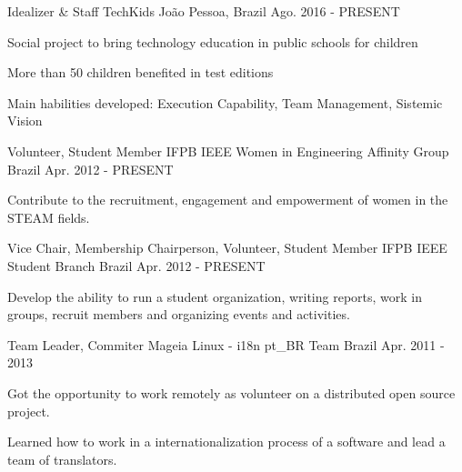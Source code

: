 \begin{cventries}
\cventry
    {Idealizer \& Staff}
    {TechKids}
    {João Pessoa, Brazil}
    {Ago. 2016 - PRESENT}
    {
      \begin{cvitems}
        \item {Social project to bring technology education in public schools for children}
        \item {More than 50 children benefited in test editions}
        \item {Main habilities developed: Execution Capability, Team Management, Sistemic Vision}
      \end{cvitems}
    }
    
  \cventry
    {Volunteer, Student Member} %
    {IFPB IEEE Women in Engineering Affinity Group} %
    {Brazil} %
    {Apr. 2012 - PRESENT} %
    {
      \begin{cvitems} %
       \item {Contribute to the recruitment, engagement and empowerment of women in the STEAM fields.}
      \end{cvitems}
    }

  \cventry
    {Vice Chair, Membership Chairperson, Volunteer, Student Member} %
    {IFPB IEEE Student Branch} %
    {Brazil} %
    {Apr. 2012 - PRESENT} %
    {
      \begin{cvitems} %
         \item {Develop the ability to run a student organization, writing reports, work in groups, recruit members and organizing events and activities.}
      \end{cvitems}
    }
    
    
  \cventry
    {Team Leader, Commiter} %
    {Mageia Linux - i18n pt\_BR Team} %
    {Brazil} %
    {Apr. 2011 - 2013} %
    {
      \begin{cvitems} %
        \item {Got the opportunity to work remotely as volunteer on a distributed open source project.}
		\item {Learned how to work in a internationalization process of a software and lead a team of translators.}
      \end{cvitems}
    }

\end{cventries}
